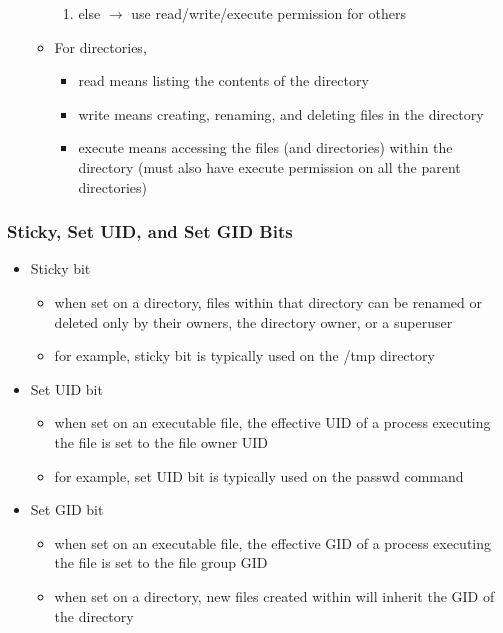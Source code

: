 \documentclass[final]{article}
\begin{document}
\begin{itemize}[nosep]
\begin{itemize}[nosep]
\begin{enumerate}[nosep]
                        \item else $\rightarrow$ use read/write/execute permission for others
                    \end{enumerate}
              \item For directories,
                    \begin{itemize}[nosep]
                        \item read means listing the contents of the directory
                        \item write means creating, renaming, and deleting files in the directory
                        \item execute means accessing the files (and directories) within the directory (must also have execute permission on all the parent directories)
                    \end{itemize}
          \end{itemize}
\end{itemize}
\subsubsection*{Sticky, Set UID, and Set GID Bits}
\begin{itemize}[nosep]
    \item Sticky bit
          \begin{itemize}[nosep]
              \item when set on a directory, files within that directory can be renamed or deleted only by their owners, the directory owner, or a superuser
              \item for example, sticky bit is typically used on the /tmp directory
          \end{itemize}
    \item Set UID bit
          \begin{itemize}[nosep]
              \item when set on an executable file, the effective UID of a process executing the file is set to the file owner UID
              \item for example, set UID bit is typically used on the passwd command
          \end{itemize}
    \item Set GID bit
          \begin{itemize}[nosep]
              \item when set on an executable file, the effective GID of a process executing the file is set to the file group GID
              \item when set on a directory, new files created within will inherit the GID of the directory
          \end{itemize}
\end{itemize}
\end{document}
